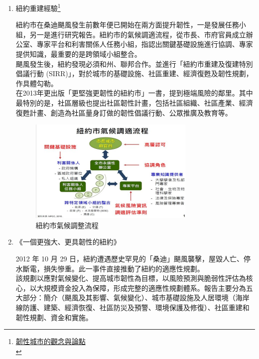 \documentclass[a4paper,12pt]{article}
\begin{document}
\begin{enumerate}
\begin{enumerate}
\item 紐約重建經驗\footnote{\href{http://www.yucc.org.tw/news/domestic/20150302-1}{韌性城市的觀念與論點 }\\}
\label{sec:orgadb51ca}

紐約市在桑迪颶風發生前數年便已開始在兩方面提升韌性，一是發展任務小組，另一是進行研究報告。紐約市的氣候調適流程，從市長、市府官員成立辦公室、專家平台和利害關係人任務小組，指認出關鍵基礎設施進行協調、專家提供知識，最重要的是跨領域小組整合。\\

颶風發生後，紐約發現必須和州、聯邦合作。並進行「紐約市重建及復建特別倡議行動 (SIRR)」，對於城市的基礎設施、社區重建、經濟復甦及韌性規劃，作具體勾勒。\\

在2013年更出版「更堅強更韌性的紐約市」一書，提到極端風險的鄰里。其中最特別的是，社區層級也提出社區韌性計畫，包括社區組織、社區產業、經濟復甦計畫、創造為社區量身訂做的韌性倡議行動、公眾推廣及教育等。\\

\begin{figure}[htbp]
\centering
\includegraphics[width=300]{images/7d107d045e026c2350198abf90696d417a0b1.jpg}
\caption{\label{fig:NY2}紐約市氣候調整流程}
\end{figure}

\item 《一個更強大、更具韌性的紐約》
\label{sec:org0cf6e1c}

2012 年 10 月 29 日，紐約遭遇歷史罕見的「桑迪」颶風襲擊，屋毀人亡、停水斷電，損失慘重。此一事件直接推動了紐約的適應性規劃。\\

該規劃以應對氣候變化、提高城市韌性為目標，以風險預測與脆弱性評估為核心，以大規模資金投入為保障，形成完整的適應性規劃體系。報告主要分為五大部分：簡介（颶風及其影響、氣候變化）、城市基礎設施及人居環境（海岸線防護、建築、經濟恢復、社區防災及預警、環境保護及修復）、社區重建和韌性規劃、資金和實施。\\


\end{enumerate}
\end{enumerate}
\end{document}

